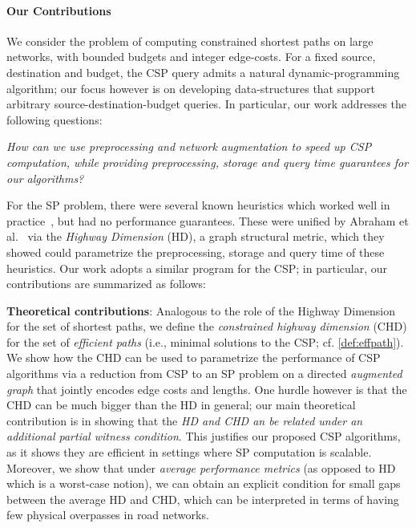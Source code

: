 
\paragraph{Our Contributions}
We consider the problem of computing constrained shortest paths on large networks, with bounded budgets and integer edge-costs. For a fixed source, destination and budget, the CSP query admits a natural dynamic-programming algorithm; our focus however is on developing data-structures that support arbitrary source-destination-budget queries. In particular, our work addresses the following questions:
\vspace{-0.1cm}
\begin{center}
\emph{How can we use preprocessing and network augmentation to speed up CSP computation, while providing preprocessing, storage and query time guarantees for our algorithms?}
\end{center}
\vspace{-0.1cm}

For the SP problem, there were several known heuristics which worked well in practice~\cite{dimacs09}, but had no performance guarantees.
These were unified by Abraham et al.~\cite{highway2013, highway2010} via the \emph{Highway Dimension} (HD), a graph structural metric, which they showed could parametrize the preprocessing, storage and query time of these heuristics.
Our work adopts a similar program for the CSP; in particular, our contributions are summarized as follows:

\noindent\textbf{Theoretical contributions}: 
Analogous to the role of the Highway Dimension for the set of shortest paths, we define the \emph{constrained highway dimension} (CHD) for the set of {\em efficient paths} (i.e., minimal solutions to the CSP; cf. \cref{def:effpath}). We show how the CHD can be used to parametrize the performance of CSP algorithms via a reduction from CSP to an SP problem on a directed \emph{augmented graph} that jointly encodes edge costs and lengths. One hurdle however is that the CHD can be much bigger than the HD in general; our main theoretical contribution is in showing that the \emph{HD and CHD an be related under an additional partial witness condition}. 
This justifies our proposed CSP algorithms, as it shows they are efficient in settings where SP computation is scalable. Moreover, we show that under \emph{average performance metrics} (as opposed to HD which is a worst-case notion), we can obtain an explicit condition for small gaps between the average HD and CHD, which can be interpreted in terms of having few physical overpasses in road networks.

